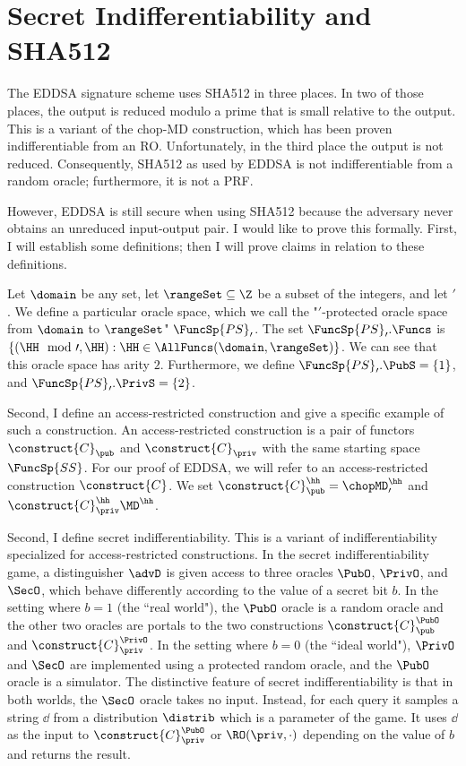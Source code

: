 \section{Secret Indifferentiability and SHA512}
The EDDSA signature scheme uses SHA512 in three places. In two of those places, the output is reduced modulo a prime that is small relative to the output. This is a variant of the chop-MD construction, which has been proven indifferentiable from an RO. Unfortunately, in the third place the output is not reduced. Consequently, SHA512 as used by EDDSA is not indifferentiable from a random oracle; furthermore, it is not a PRF. 

However, EDDSA is still secure when using SHA512 because the adversary never obtains an unreduced input-output pair. I would like to prove this formally. First, I will establish some definitions; then I will prove claims in relation to these definitions.

Let $\domain$ be any set, let $\rangeSet\subseteq \Z$ be a subset of the integers, and let $\prime$. We define a particular oracle space, which we call the "$\prime$-protected oracle space from $\domain$ to $\rangeSet$" $\FuncSp{PS}_\prime$. The set $\FuncSp{PS}_\prime.\Funcs$ is $\{(\HH \mod \prime, \HH) : \HH\in \AllFuncs(\domain, \rangeSet) \}$. We can see that this oracle space has arity $2$. Furthermore, we define $\FuncSp{PS}_\prime.\PubS = \{1\}$, and $\FuncSp{PS}_\prime.\PrivS = \{2\}$. 



Second, I define an access-restricted construction and give a specific example of such a construction.
An access-restricted construction is a pair of functors $\construct{C}_{\pub}$ and $\construct{C}_{\priv}$ with the same starting space $\FuncSp{SS}$. For our proof of EDDSA, we will refer to an access-restricted construction $\construct{C}$. We set $\construct{C}^{\hh}_{\pub} = \chopMD_\prime^{\hh}$ and $\construct{C}^{\hh}_{\priv} \MD^{\hh}$.

Second, I define secret indifferentiability. This is a variant of indifferentiability specialized for access-restricted constructions. In the secret indifferentiability game, a distinguisher $\advD$ is given access to three oracles $\PubO$, $\PrivO$, and $\SecO$, which behave differently according to the value of a secret bit $b$.  In the setting where $b=1$ (the ``real world"), the $\PubO$ oracle is a random oracle and the other two oracles are portals to the two constructions $\construct{C}^{\PubO}_{\pub}$ and $\construct{C}^{\PrivO}_{\priv}$. In the setting where $b=0$ (the ``ideal world"), $\PrivO$ and $\SecO$ are implemented using a protected random oracle, and the $\PubO$ oracle is a simulator. The distinctive feature of secret indifferentiability is that in both worlds, the $\SecO$ oracle takes no input. Instead, for each query it samples a string $\dd$ from a distribution $\distrib$ which is a parameter of the game. It uses $\dd$ as the input to $\construct{C}^{\PubO}_{\priv}$ or $\RO(\priv, \cdot)$ depending on the value of $b$ and returns the result. 

